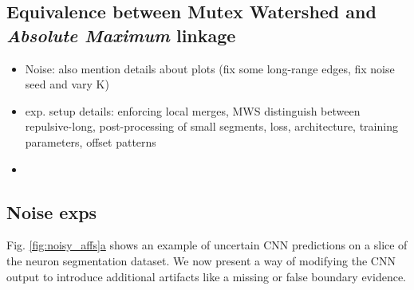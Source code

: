 \subsection{Equivalence between Mutex Watershed and \emph{Absolute Maximum} linkage}

\begin{itemize}
\item Noise: also mention details about plots (fix some long-range edges, fix noise seed and vary K)
\item exp. setup details: enforcing local merges, MWS distinguish between repulsive-long, post-processing of small segments, loss, architecture, training parameters, offset patterns
\item 

\end{itemize}




\subsection{Noise exps}
Fig. \hyperref[fig:noisy_affs]{\ref*{fig:noisy_affs}a} shows an example of uncertain CNN predictions on a slice of the neuron segmentation dataset. We now present a way of modifying the CNN output to introduce additional artifacts like a missing or false boundary evidence. 


